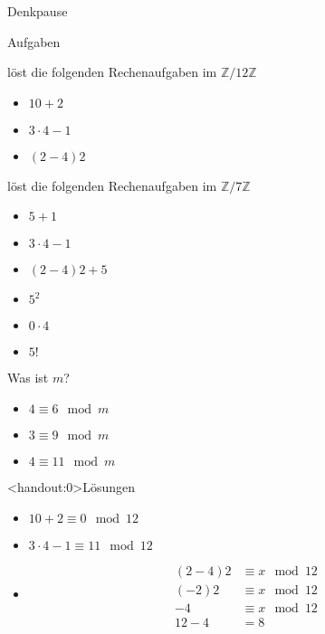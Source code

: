 {
\begin{frame}[fragile]{Denkpause}
	\footnotesize
	\begin{alertblock}{Aufgaben}
	\end{alertblock}
	\begin{block}{löst die folgenden Rechenaufgaben im $\mathbb Z/12\mathbb Z$}
		\begin{multicols}{3}
			\begin{itemize}
				\item $10 + 2$
				\item $3\cdot4-1$
				\item $(2-4)2$
			\end{itemize}
		\end{multicols}
	\end{block}
	\begin{block}{löst die folgenden Rechenaufgaben im $\mathbb Z/7\mathbb Z$}
		\begin{multicols}{3}
			\begin{itemize}
				\item $5 + 1$
				\item $3\cdot4-1$
				\item $(2-4)2+5$
				\item $5^2$
				\item $0\cdot4$
				\item $5!$
			\end{itemize}
		\end{multicols}
	\end{block}
	\begin{block}{Was ist $m$?}
		\begin{multicols}{3}
			\begin{itemize}
				\item $4 \equiv 6 \mod m$
				\item $3 \equiv 9 \mod m$
				\item $4 \equiv 11 \mod m$
			\end{itemize}
		\end{multicols}
	\end{block}
\end{frame}

\begin{frame}<handout:0>{Lösungen}
	\begin{itemize}[<+- | alert@+>]
		\item $10+2 \equiv 0 \mod 12$
		\item $3\cdot 4-1 \equiv 11 \mod 12$
		\item
		      \begin{align*}
			      (2-4)2 & \equiv x \mod 12 \\
			      (-2)2  & \equiv x \mod 12 \\
			      -4     & \equiv x \mod 12 \\
			      12-4   & =8
		      \end{align*}


\end{itemize}
\end{frame}}
